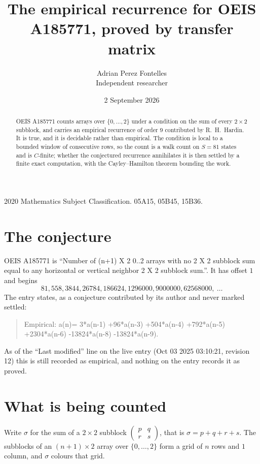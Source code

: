 \documentclass[11pt,a4paper]{article}
\title{The empirical recurrence for OEIS A185771, proved by transfer matrix}
\author{Adrian Perez Fontelles\\ \small Independent researcher}
\date{2 September 2026}
\theoremstyle{plain}
\theoremstyle{definition}
\begin{document}
\maketitle

\begin{abstract}
OEIS A185771 counts arrays over $\{0,\dots,2\}$ under a condition on the sum of every
$2\times2$ subblock, and carries an empirical recurrence of order $9$ contributed by
R.~H.~Hardin. It is true, and it is decidable rather than empirical. The condition is local to
a bounded window of consecutive rows, so the count is a walk count on $S=81$ states and is
$C$-finite; whether the conjectured recurrence annihilates it is then settled by a finite exact
computation, with the Cayley--Hamilton theorem bounding the work.
\end{abstract}

\noindent\small 2020 Mathematics Subject Classification. 05A15, 05B45, 15B36.\normalsize

\section{The conjecture}

OEIS A185771 is ``Number of (n+1) X 2 0..2 arrays with no 2 X 2 subblock sum equal to any horizontal or vertical neighbor 2 X 2 subblock sum.''. It has offset $1$ and begins
\[
81, 558, 3844, 26784, 186624, 1296000, 9000000, 62568000,\ \dots
\]
The entry states, as a conjecture contributed by its author and never marked settled:
\begin{quote}
Empirical: a(n)= 3*a(n-1) +96*a(n-3) +504*a(n-4) +792*a(n-5) +2304*a(n-6) -13824*a(n-8) -13824*a(n-9).
\end{quote}
As of the ``Last modified'' line on the live entry (Oct 03 2025 03:10:21, revision 12) this is still
recorded as empirical, and nothing on the entry records it as proved.

\section{What is being counted}

Write $\sigma$ for the sum of a $2\times2$ subblock
$\begin{pmatrix}p&q\\r&s\end{pmatrix}$, that is $\sigma=p+q+r+s$. The subblocks of an
$(n+1)\times2$ array over $\{0,\dots,2\}$ form a grid of $n$ rows and $1$
column, and $\sigma$ colours that grid.
\end{document}
